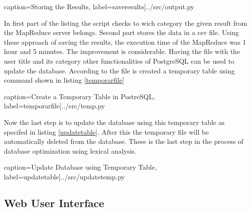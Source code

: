  caption={Storing the Results}, label=saveresults]{../src/output.py}

In first part of the listing the script checks to wich category the given result from the MapReduce server belongs. Second part stores the data in a csv file. Using these approach of saving the results, the execution time of the MapReduce was 1 hour and 5 minutes. The improvement is considerable. Having the file with the user title and its category other functionalities of PostgreSQL can be used to update the database. According to the file is created a temporary table using command shown in listing \ref{temporarfile}

 caption={Create a Temporary Table in PostreSQL}, label=temporarfile]{../src/temp.py}

Now the last step is to update the database using this temporary table as specifed in listing \ref{updatetable}. After this the temporary file will be automatically deleted from the database. These is the last step in the process of database optimization using lexical analysis. 

 caption={Update Database using Temporary Table}, label=updatetable]{../src/updatetemp.py}

\subsection{Web User Interface}









